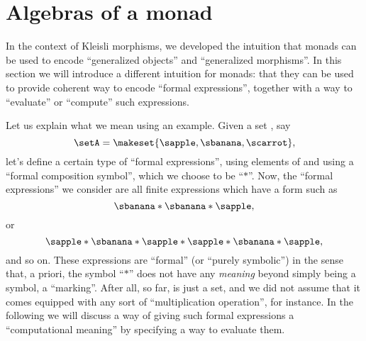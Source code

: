 
\section{Algebras of a monad}
\label{sec:Eilenberg-Moore}



In the context of Kleisli morphisms, we developed the intuition that monads can be used to encode ``generalized objects'' and ``generalized morphisms''.
In this section we will introduce a different intuition for monads: that they can be used to provide coherent way to encode ``formal expressions'', together with a way to ``evaluate'' or ``compute'' such expressions.

Let us explain what we mean using an example.
Given a set \setA, say
\begin{equation}
    \setA = \makeset{ \sapple, \sbanana, \scarrot },
\end{equation}
let's define a certain type of ``formal expressions'', using elements of \setA and using a ``formal composition symbol'', which we choose to be ``$*$''.
Now, the ``formal expressions'' we consider are all finite expressions which have a form such as
\begin{equation}
    \label{eq:formal-composition-1}
    \sbanana * \sbanana * \sapple,
\end{equation}
or
\begin{equation}
    \label{eq:formal-composition-2}
    \sapple * \sbanana * \sapple * \sapple * \sbanana * \sapple,
\end{equation}
and so on.
These expressions are ``formal'' (or ``purely symbolic'') in the sense that, a priori, the symbol ``$*$'' does not have any \emph{meaning} beyond simply being a symbol, a ``marking''.
After all, so far, \setA is just a set, and we did not assume that it comes equipped with any sort of ``multiplication operation'', for instance.
In the following we will discuss a way of giving such formal expressions a ``computational meaning'' by specifying a way to evaluate them.

